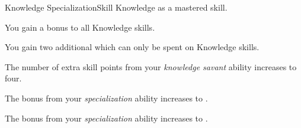     \begin{feat}{Knowledge Specialization}{Skill}
        \featpre Knowledge as a mastered skill.

         You gain a  bonus to all Knowledge skills.

         You gain two additional  which can only be spent on Knowledge skills.

         The number of extra skill points from your \textit{knowledge savant} ability increases to four.

         The bonus from your \textit{specialization} ability increases to .

         The bonus from your \textit{specialization} ability increases to .
    \end{feat}

